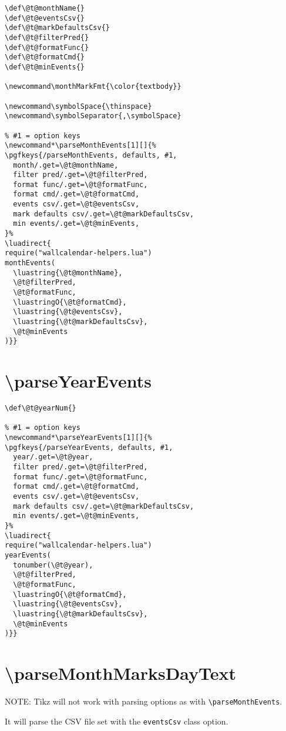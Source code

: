 \documentclass[11pt,oneside]{memoir-article}
\begin{document}
\begin{verbatim}
\def\@t@monthName{}
\def\@t@eventsCsv{}
\def\@t@markDefaultsCsv{}
\def\@t@filterPred{}
\def\@t@formatFunc{}
\def\@t@formatCmd{}
\def\@t@minEvents{}

\newcommand\monthMarkFmt{\color{textbody}}

\newcommand\symbolSpace{\thinspace}
\newcommand\symbolSeparator{,\symbolSpace}

% #1 = option keys
\newcommand*\parseMonthEvents[1][]{%
\pgfkeys{/parseMonthEvents, defaults, #1,
  month/.get=\@t@monthName,
  filter pred/.get=\@t@filterPred,
  format func/.get=\@t@formatFunc,
  format cmd/.get=\@t@formatCmd,
  events csv/.get=\@t@eventsCsv,
  mark defaults csv/.get=\@t@markDefaultsCsv,
  min events/.get=\@t@minEvents,
}%
\luadirect{
require("wallcalendar-helpers.lua")
monthEvents(
  \luastring{\@t@monthName},
  \@t@filterPred,
  \@t@formatFunc,
  \luastringO{\@t@formatCmd},
  \luastring{\@t@eventsCsv},
  \luastring{\@t@markDefaultsCsv},
  \@t@minEvents
)}}
\end{verbatim}

\section{\textbackslash parseYearEvents}
\label{sec:orgb89e36b}

\begin{verbatim}
\def\@t@yearNum{}

% #1 = option keys
\newcommand*\parseYearEvents[1][]{%
\pgfkeys{/parseYearEvents, defaults, #1,
  year/.get=\@t@year,
  filter pred/.get=\@t@filterPred,
  format func/.get=\@t@formatFunc,
  format cmd/.get=\@t@formatCmd,
  events csv/.get=\@t@eventsCsv,
  mark defaults csv/.get=\@t@markDefaultsCsv,
  min events/.get=\@t@minEvents,
}%
\luadirect{
require("wallcalendar-helpers.lua")
yearEvents(
  tonumber(\@t@year),
  \@t@filterPred,
  \@t@formatFunc,
  \luastringO{\@t@formatCmd},
  \luastring{\@t@eventsCsv},
  \luastring{\@t@markDefaultsCsv},
  \@t@minEvents
)}}
\end{verbatim}

\section{\textbackslash parseMonthMarksDayText}
\label{sec:org24e0024}

NOTE: Tikz will not work with parsing options as with \texttt{\textbackslash{}parseMonthEvents}.

It will parse the CSV file set with the \texttt{eventsCsv} class option.
\end{document}
